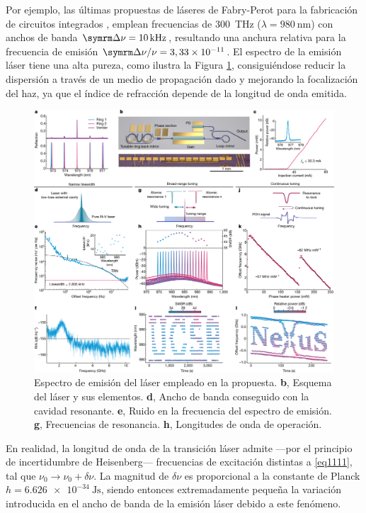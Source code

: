 Por ejemplo, las últimas propuestas de láseres de Fabry-Perot para la fabricación de circuitos integrados \autocite{Tran2022ExtendingWavelengths}, emplean frecuencias de \qty{300}{\THz} ($\lambda = \qty{980}{\nm}$) con anchos de banda $\del\nu = \qty{10}{\kHz}$, resultando una anchura relativa para la frecuencia de emisión $\del\nu/\nu = 3,33\times 10^{-11}$. El espectro de la emisión láser tiene una alta pureza, como ilustra la Figura \ref{figch1_amplif}, consiguiéndose reducir la dispersión a través de un medio de propagación dado y mejorando la focalización del haz, ya que el índice de refracción depende de la longitud de onda emitida.

\begin{figure}[ht!]
    \centering
    \includegraphics[width=\textwidth]{Figuras/ch1_amplif.png}
    \caption{Espectro de emisión del láser empleado en la propuesta\autocite{Tran2022ExtendingWavelengths}. \textbf{b}, Esquema del láser y sus elementos. \textbf{d}, Ancho de banda conseguido con la cavidad resonante. \textbf{e}, Ruido en la frecuencia del espectro de emisión. \textbf{g}, Frecuencias de resonancia. \textbf{h}, Longitudes de onda de operación.}
    \label{figch1_amplif}
\end{figure}

En realidad, la longitud de onda de la transición láser admite ---por el principio de incertidumbre de Heisenberg--- frecuencias de excitación distintas a \eqref{eq1111}, tal que $\nu_0\rightarrow\nu_0 + \delta\nu$. La magnitud de $\delta\nu$ es proporcional a la constante de Planck $h = \qty{6,626e-34}{\J\s}$, siendo entonces extremadamente pequeña la variación introducida en el ancho de banda de la emisión láser debido a este fenómeno. 

